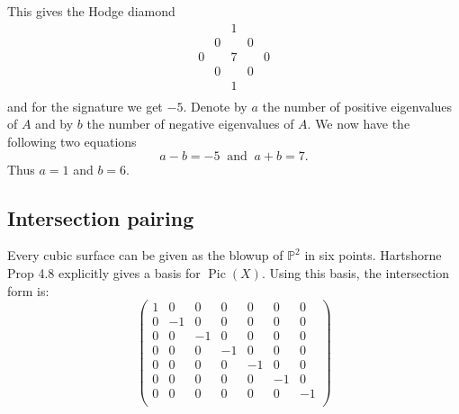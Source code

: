\documentclass[a4paper, DIV=12]{scrreprt}
\newcommand{\PP}{{\mathbb P}}
\DeclareMathOperator{\Pic}{Pic}
\begin{document}
This gives the Hodge diamond
\[
\begin{array}{ccccc}
&&1&&\\
& 0 && 0 & \\
0 && 7 && 0\\
& 0 && 0 & \\
&&1&&\\
\end{array}
\]
and for the signature we get $-5$. Denote by $a$ the number of positive eigenvalues of $A$ and by $b$ the number of negative eigenvalues of $A$. We now have the following two equations
\[
a-b = -5\ \mbox{ and }\ a+b = 7.
\]
Thus $a=1$ and $b=6$.

\subsection*{Intersection pairing}
Every cubic surface can be given as the blowup of $\PP^2$ in six points. Hartshorne Prop 4.8 explicitly gives a basis for $\Pic(X)$. Using this basis, the intersection form is:
\[
\left(
\begin{array}{ccccccc}
1 & 0 & 0 & 0 & 0 & 0 & 0 \\
0 & -1 & 0 & 0 & 0 & 0 & 0 \\
0 & 0 & -1 & 0 & 0 & 0 & 0 \\
0 & 0 & 0 & -1 & 0 & 0 & 0 \\
0 & 0 & 0 & 0 & -1 & 0 & 0 \\
0 & 0 & 0 & 0 & 0 & -1 & 0 \\
0 & 0 & 0 & 0 & 0 & 0 & -1 \\
\end{array}
\right)
\]
\end{document}
